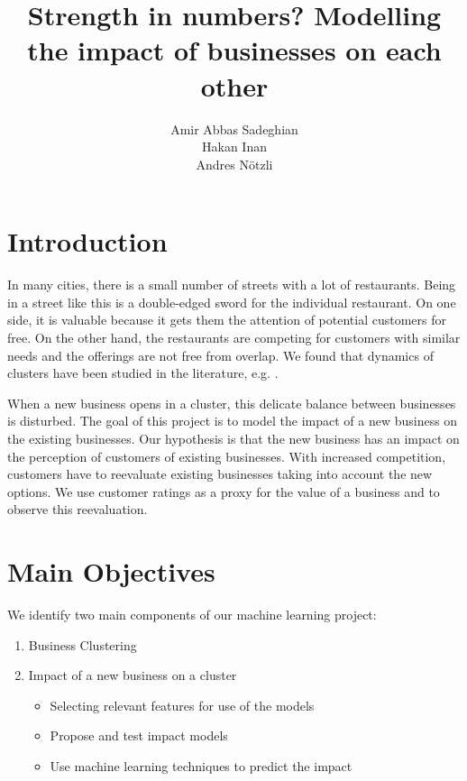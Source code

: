 \documentclass{vldb}
\begin{document}
\title{Strength in numbers? Modelling the impact of businesses on each other}


\author{
\alignauthor
Amir Abbas Sadeghian\\
\alignauthor
Hakan Inan\\
\alignauthor 
Andres N\"otzli\\
}

\maketitle

\section{Introduction}
In many cities, there is a small number of streets with a lot of restaurants.
Being in a street like this is a double-edged sword for the individual restaurant.
On one side, it is valuable because it gets them the attention of potential customers for free.
On the other hand, the restaurants are competing for customers with similar needs and the offerings are not free from overlap.
We found that dynamics of clusters have been studied in the literature, e.g. \cite{mccann2002industrial, porter1998clusters, schmitz1999global}.

When a new business opens in a cluster, this delicate balance between businesses is disturbed.
The goal of this project is to model the impact of a new business on the existing businesses.
Our hypothesis is that the new business has an impact on the perception of customers of existing businesses.
With increased competition, customers have to reevaluate existing businesses taking into account the new options.
We use customer ratings as a proxy for the value of a business and to observe this reevaluation.

\section*{Main Objectives}
We identify two main components of our machine learning project:
\begin{enumerate}
\item Business Clustering
\item Impact of a new business on a cluster
	\begin{itemize}
	 \item Selecting relevant features for use of the models
 	 \item Propose and test impact models
 	 \item Use machine learning techniques to predict the impact
  	\end{itemize}
\end{enumerate}
\end{document}
